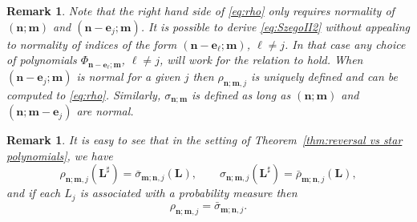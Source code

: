 \documentclass[reqno,centertags,11pt,draft]{amsart}
\newtheorem{prop}[thm]{Proposition}
\newtheorem{rem}[thm]{Remark}
\begin{document}
\begin{rem}
    Note that the right hand side of \eqref{eq:rho} only requires normality of $(\bm{n};\bm{m})$ and $(\bm{n}-\bm{e}_j;\bm{m})$. It is possible to derive \eqref{eq:SzegoII2} without appealing to normality of indices of the form $(\bm{n}-\bm{e}_{\ell};\bm{m})$, $\ell\ne j$. In that case any choice of polynomials $\Phi_{\bm{n}-\bm{e}_{\ell};\bm{m}}$,  $\ell\ne j$, will work for the relation to hold. When $(\bm{n}-\bm{e}_j;\bm{m})$ is normal for a given $j$ then $\rho_{\bm{n};\bm{m},j}$ is uniquely defined and can be computed to \eqref{eq:rho}. Similarly, $\sigma_{\bm{n};\bm{m}}$ is defined as long as $(\bm{n};\bm{m})$ and $(\bm{n};\bm{m}-\bm{e}_j)$ are normal. 
\end{rem}

    
\begin{rem}\label{rem:reversal}
    It is easy to see that in the setting of 
         Theorem~\ref{thm:reversal vs star polynomials}, we have
         \begin{equation}
             \rho_{\bm{n};\bm{m},j}(\bm{L}^\sharp) = \bar\sigma_{\bm{m};\bm{n},j}(\bm{L}), \qquad \sigma_{\bm{n};\bm{m},j}(\bm{L}^\sharp) = \bar\rho_{\bm{m};\bm{n},j}(\bm{L}),
        \end{equation}
        and if each $L_j$ is associated with a probability measure then
        \begin{equation}
             \rho_{\bm{n};\bm{m},j}= \bar\sigma_{\bm{m};\bm{n},j} .
        \end{equation}
\end{rem}


\end{document}
